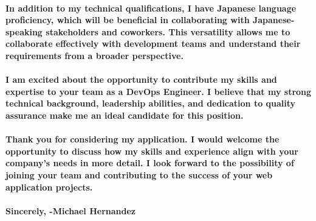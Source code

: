 \documentclass[a4paper,12pt]{article}
\def\jobName{DevOps Engineer}
\begin{document}
	\paragraph{In addition to my technical qualifications, I have Japanese language proficiency, which will be beneficial in collaborating with Japanese-speaking stakeholders and coworkers.   This versatility allows me to collaborate effectively with development teams and understand their requirements from a broader perspective.}
	
	\paragraph{I am excited about the opportunity to contribute my skills and expertise to your team as a \jobName. I believe that my strong technical background, leadership abilities, and dedication to quality assurance make me an ideal candidate for this position.}
	
	\paragraph{Thank you for considering my application. I would welcome the opportunity to discuss how my skills and experience align with your company's needs in more detail. I look forward to the possibility of joining your team and contributing to the success of your web application projects.}
	
	\paragraph{Sincerely, \linebreak-Michael Hernandez \linebreak}
	
	
\end{document}
